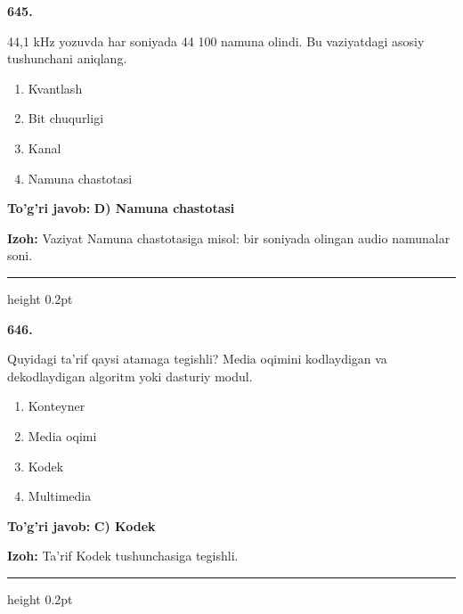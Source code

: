 \documentclass[10pt,a4paper,oneside]{article}
\begin{document}
\noindent\textbf{\color{ink}645.}
\par
44,1 kHz yozuvda har soniyada 44 100 namuna olindi. Bu vaziyatdagi asosiy tushunchani aniqlang.
\begin{enumerate}[label=\Alph*),leftmargin=9mm]
\item Kvantlash
\item Bit chuqurligi
\item Kanal
\item Namuna chastotasi
\end{enumerate}
\begin{tcolorbox}[enhanced,breakable,colback=teal!4,colframe=teal!50!black,boxrule=0.5pt,arc=1.1mm,left=3mm,right=3mm,top=1.7mm,bottom=1.7mm,before skip=2mm,after skip=2mm]
\textbf{\color{teal}To'g'ri javob:} \textbf{D) Namuna chastotasi}
\par\smallskip
\textbf{Izoh:} Vaziyat Namuna chastotasiga misol: bir soniyada olingan audio namunalar soni.
\end{tcolorbox}
\vspace{2mm}\hrule height 0.2pt \vspace{3mm}

\noindent\textbf{\color{ink}646.}
\par
Quyidagi ta'rif qaysi atamaga tegishli? Media oqimini kodlaydigan va dekodlaydigan algoritm yoki dasturiy modul.
\begin{enumerate}[label=\Alph*),leftmargin=9mm]
\item Konteyner
\item Media oqimi
\item Kodek
\item Multimedia
\end{enumerate}
\begin{tcolorbox}[enhanced,breakable,colback=teal!4,colframe=teal!50!black,boxrule=0.5pt,arc=1.1mm,left=3mm,right=3mm,top=1.7mm,bottom=1.7mm,before skip=2mm,after skip=2mm]
\textbf{\color{teal}To'g'ri javob:} \textbf{C) Kodek}
\par\smallskip
\textbf{Izoh:} Ta'rif Kodek tushunchasiga tegishli.
\end{tcolorbox}
\vspace{2mm}\hrule height 0.2pt \vspace{3mm}
\end{document}
